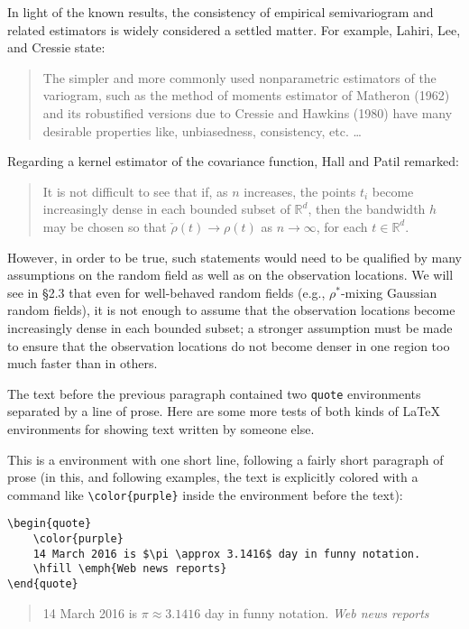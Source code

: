 \begin{itshape}
    In light of the known results, the consistency
    of empirical semivariogram and related
    estimators is widely considered a settled
    matter.  For example, Lahiri, Lee, and Cressie
    \cite{Lahiri:2002:ADA} state:

    \begin{quote}
        The simpler and more commonly used
        nonparametric estimators of the variogram,
        such as the method of moments estimator of
        Matheron (1962) and its robustified
        versions due to Cressie and Hawkins (1980)
        have many desirable properties like,
        unbiasedness, consistency, etc. \ldots
    \end{quote}
    \noindent
    Regarding a kernel estimator of the covariance
    function, Hall and Patil
    \cite{Hall:1994:PNE} remarked:
    \begin{quote}
        It is not difficult to see that if, as $ n
        $ increases, the points $ t_i $ become
        increasingly dense in each bounded subset
        of $ \mathbb{R}^d $, then the bandwidth $
        h $ may be chosen so that $ \check \rho(t)
        \to \rho(t) $ as $ n \to \infty $, for
        each $ t \in \mathbb{R}^d $.
    \end{quote}
    However, in order to be true, such statements
    would need to be qualified by many assumptions
    on the random field as well as on the
    observation locations. We will see in
    \S2.3 that even for well-behaved
    random fields (e.g., $\rho^*$-mixing Gaussian
    random fields), it is not enough to assume
    that the observation locations become
    increasingly dense in each bounded subset; a
    stronger assumption must be made to ensure
    that the observation locations do not become
    denser in one region too much faster than in
    others.
\end{itshape}

The text before the previous paragraph contained
two \texttt{quote} environments separated by a
line of prose.  Here are some more tests of both
kinds of \LaTeX{} environments for showing text
written by someone else.

This is a  environment
with one short line, following a fairly short
paragraph of prose (in this, and following
examples, the text is explicitly colored with a
command like \verb=\color{purple}= inside the
environment before the text):

\begin{singlespace}
\color{darkblue}
\begin{verbatim}
\begin{quote}
    \color{purple}
    14 March 2016 is $\pi \approx 3.1416$ day in funny notation.
    \hfill \emph{Web news reports}
\end{quote}
\end{verbatim}
\end{singlespace}
%
\begin{quote}
    \color{purple}
    14 March 2016 is $\pi \approx 3.1416$ day in funny notation.
    \hfill \emph{Web news reports}
\end{quote}

